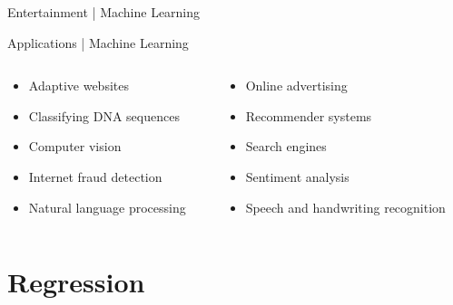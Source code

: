 \documentclass[10pt]{beamer}
\begin{document}
			\begin{frame}{Entertainment | Machine Learning}
			\end{frame}
			\begin{frame}{Applications | Machine Learning}
				\begin{columns}
					\begin{column}{0.5\textwidth}
						\begin{itemize}
							\item Adaptive websites
							\item Classifying DNA sequences
							\item Computer vision
							\item Internet fraud detection
							\item Natural language processing
						\end{itemize}
					\end{column}
					\begin{column}{0.5\textwidth}
						\begin{itemize}
							\item Online advertising
							\item Recommender systems
							\item Search engines
							\item Sentiment analysis
							\item Speech and handwriting recognition
						\end{itemize}
					\end{column}
				\end{columns}
			\end{frame}
	\section{Regression}
\end{document}
